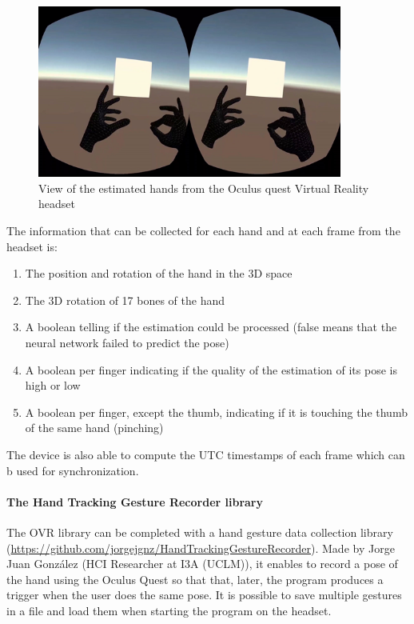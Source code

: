 \documentclass{article}
\begin{document}
\begin{figure}[h]
    \centering
    \includegraphics[width=10cm]{images/questView.png}
    \caption{View of the estimated hands from the Oculus quest Virtual Reality headset}
    \label{fig:cyberGlove3}
\end{figure}

The information that can be collected for each hand and at each frame from the headset is:
\begin{enumerate}
    \item The position and rotation of the hand in the 3D space
    \item The 3D rotation of 17 bones of the hand
    \item A boolean telling if the estimation could be processed (false means that the neural network failed to predict the pose)
    \item A boolean per finger indicating if the quality of the estimation of its pose is high or low
    \item A boolean per finger, except the thumb, indicating if it is touching the thumb of the same hand (pinching)
\end{enumerate}
The device is also able to compute the UTC timestamps of each frame which can b used for synchronization.

\paragraph{The Hand Tracking Gesture Recorder library}

The OVR library can be completed with a hand gesture data collection library (\url{https://github.com/jorgejgnz/HandTrackingGestureRecorder}). Made by Jorge Juan González (HCI Researcher at I3A (UCLM)), it enables to record a pose of the hand using the Oculus Quest so that that, later, the program produces a trigger when the user does the same pose. It is possible to save multiple gestures in a file and load them when starting the program on the headset.
\end{document}

